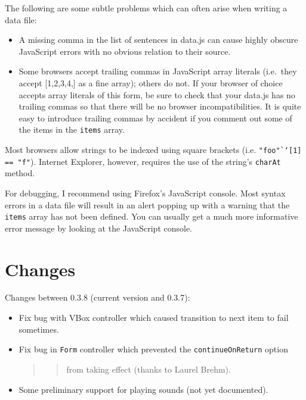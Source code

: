 \documentclass[]{article}
\begin{document}
The following are some subtle problems which can often arise when
writing a\\data file:

\begin{itemize}
\item
  A missing comma in the list of sentences in data.js can cause highly
  obscure JavaScript errors with no obvious relation to their source.
\item
  Some browsers accept trailing commas in JavaScript array literals
  (i.e.~they accept {[}1,2,3,4,{]} as a fine array); others do not. If
  your browser of choice accepts array literals of this form, be sure to
  check that your data.js has no trailing commas so that there will be
  no browser incompatibilities. It is quite easy to introduce trailing
  commas by accident if you comment out some of the items in the
  \texttt{items} array.
\end{itemize}

Most browsers allow strings to be indexed using square brackets (i.e.
\texttt{"foo"``{[}1{]}} \texttt{==\ "f"}). Internet Explorer, however,
requires the use of the string's \texttt{charAt} method.

For debugging, I recommend using Firefox's JavaScript console. Most
syntax errors in a data file will result in an alert popping up with a
warning that the \texttt{items} array has not been defined. You can
usually get a much more informative error message by looking at the
JavaScript console.

\section{Changes}\label{changes}

Changes between 0.3.8 (current version and 0.3.7):

\begin{itemize}
\item
  Fix bug with VBox controller which caused transition to next item to
  fail sometimes.
\item
  Fix bug in \texttt{Form} controller which prevented the
  \texttt{continueOnReturn} option

  \begin{quote}
  \begin{quote}
  from taking effect (thanks to Laurel Brehm).
  \end{quote}
  \end{quote}
\item
  Some preliminary support for playing sounds (not yet documented).
\end{itemize}
\end{document}
